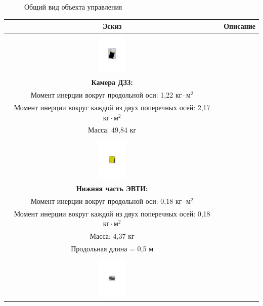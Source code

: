 \begin{figure}[h!]
    \caption{Общий вид объекта управления}
    \label{control_object_general_view}
\end{figure}

\begin{table}[h!]
    \begin{tabular}{|c|c|}
        \hline
            Эскиз & Описание \\
        \hline
            \includegraphics[height=20mm, keepaspectratio]{./src/pictures/sattelite_3d_images/camera} &
            \shortstack[l] {
                \rule{0pt}{2mm} \\
                \textbf{Камера ДЗЗ:} \\
                Момент инерции вокруг продольной оси: 1,22 $\text{кг} \cdot \text{м}^{2}$ \\
                Момент инерции вокруг каждой из двух поперечных  осей: 2,17 $\text{кг} \cdot \text{м}^{2}$ \\
                Масса: 49,84 кг \\
                \rule{0pt}{2mm}
            } \\
        \hline
            \includegraphics[height=20mm, keepaspectratio]{./src/pictures/sattelite_3d_images/bottom_shell_part} &
            \shortstack[l] {
                \rule{0pt}{2mm} \\
                \textbf{Нижняя часть ЭВТИ:} \\
                Момент инерции вокруг продольной оси: 0,18 $\text{кг} \cdot \text{м}^{2}$ \\
                Момент инерции вокруг каждой из двух поперечных  осей: 0,18 $\text{кг} \cdot \text{м}^{2}$ \\
                Масса: 4,37 кг \\
                Продольная длина = 0,5 м \\
                \rule{0pt}{2mm}
            } \\
        \hline
            \includegraphics[height=20mm, keepaspectratio]{./src/pictures/sattelite_3d_images/top_shell_part} &

\end{tabular}
\end{table}
